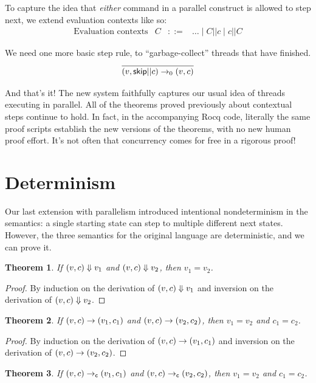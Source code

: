 \documentclass{amsbook}
\newtheorem{theorem}{Theorem}[chapter]
\theoremstyle{definition}
\theoremstyle{remark}
\numberwithin{section}{chapter}
\numberwithin{equation}{chapter}
\begin{document}
To capture the idea that \emph{either} command in a parallel construct is allowed to step next, we extend evaluation contexts like so:
\encoding
$$\begin{array}{rrcl}
  \textrm{Evaluation contexts} & C &::=& \ldots \mid C || c \mid c || C
\end{array}$$

We need one more basic step rule, to ``garbage-collect'' threads that have finished.
$$\infer{\smallstepo{(v, \skipe || c)}{(v, c)}}{}$$

And that's it!
The new system faithfully captures our usual idea of threads executing in parallel.
All of the theorems proved previously about contextual steps continue to hold.
In fact, in the accompanying Rocq code, literally the same proof scripts establish the new versions of the theorems, with no new human proof effort.
It's not often that concurrency comes for free in a rigorous proof!


\section{Determinism}

Our last extension with parallelism introduced intentional nondeterminism in the semantics: a single starting state can step to multiple different next states.
However, the three semantics for the original language are deterministic, and we can prove it.

\begin{theorem}
  If $(v, c) \Downarrow v_1$ and $(v, c) \Downarrow v_2$, then $v_1 = v_2$.
\end{theorem}

\begin{proof}
  By induction on the derivation of $(v, c) \Downarrow v_1$ and inversion on the derivation of $(v, c) \Downarrow v_2$.
\end{proof}

\begin{theorem}
  If $(v, c) \to (v_1, c_1)$ and $(v, c) \to (v_2, c_2)$, then $v_1 = v_2$ and $c_1 = c_2$.
\end{theorem}

\begin{proof}
  By induction on the derivation of $(v, c) \to (v_1, c_1)$ and inversion on the derivation of $(v, c) \to (v_2, c_2)$.
\end{proof}

\begin{theorem}
  If $(v, c) \to_\mathsf{c} (v_1, c_1)$ and $(v, c) \to_\mathsf{c} (v_2, c_2)$, then $v_1 = v_2$ and $c_1 = c_2$.
\end{theorem}
\end{document}
